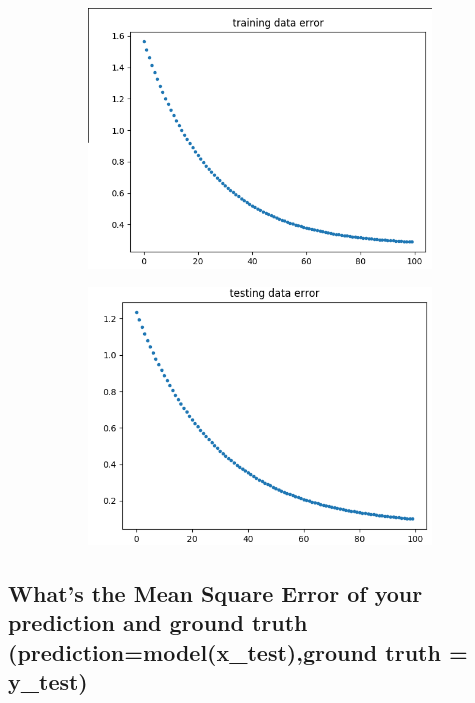 \documentclass{article}
\begin{document}
				\begin{figure}[!ht]
					\centering
						\begin{subfigure}{0.4\linewidth}
						\includegraphics[width=\linewidth]{training_data_error.png}
					\end{subfigure}
					\begin{subfigure}{0.4\linewidth}
						\includegraphics[width=\linewidth]{testing_data_error.png}
					\end{subfigure}
				\end{figure}

		\subsection{What's the Mean Square Error of your prediction and ground truth
				(prediction=model(x\_test),ground truth = y\_test)}
\end{document}
